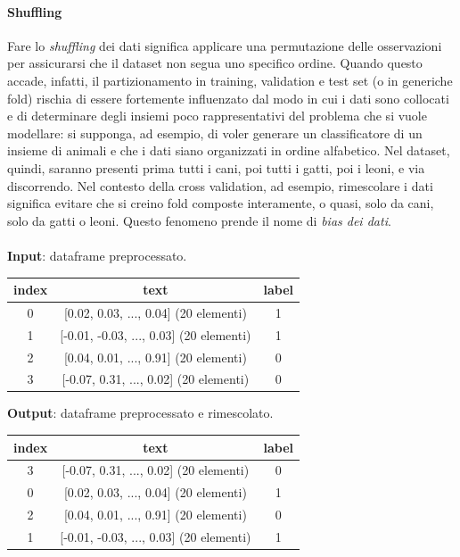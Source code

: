 \documentclass[12pt]{report}
\theoremstyle{definition}
\begin{document}
\paragraph{Shuffling}
Fare lo \textit{shuffling} dei dati significa applicare una permutazione delle osservazioni per assicurarsi che il dataset non segua uno specifico ordine. Quando questo accade, infatti, il partizionamento in training, validation e test set (o in generiche fold) rischia di essere fortemente influenzato dal modo in cui i dati sono collocati e di determinare degli insiemi poco rappresentativi del problema che si vuole modellare: si supponga, ad esempio, di voler generare un classificatore di un insieme di animali e che i dati siano organizzati in ordine alfabetico. Nel dataset, quindi, saranno presenti prima tutti i cani, poi tutti i gatti, poi i leoni, e via discorrendo. Nel contesto della cross validation, ad esempio, rimescolare i dati significa evitare che si creino fold composte interamente, o quasi, solo da cani, solo da gatti o leoni. Questo fenomeno prende il nome di \textit{bias dei dati}.
\\
\\
\textbf{Input}: dataframe preprocessato.
\begin{center}
    \begin{tabular}{|c|c|c|}
    \hline
    \textbf{index} & \textbf{text} & \textbf{label} \\
    \hline
         0 & [0.02, 0.03, ..., 0.04] (20 elementi) & 1 \\
         1 & [-0.01, -0.03, ..., 0.03] (20 elementi) & 1 \\
         2 & [0.04, 0.01, ..., 0.91] (20 elementi) & 0 \\
         3 & [-0.07, 0.31, ..., 0.02] (20 elementi) & 0 \\
    \hline
    \end{tabular}
\end{center}
\textbf{Output}: dataframe preprocessato e rimescolato.
\begin{center}
    \begin{tabular}{|c|c|c|}
    \hline
    \textbf{index} & \textbf{text} & \textbf{label} \\
    \hline
        3 & [-0.07, 0.31, ..., 0.02] (20 elementi) & 0 \\
        0 & [0.02, 0.03, ..., 0.04] (20 elementi) & 1 \\
        2 & [0.04, 0.01, ..., 0.91] (20 elementi) & 0 \\
        1 & [-0.01, -0.03, ..., 0.03] (20 elementi) & 1 \\
    \hline
    \end{tabular}
\end{center}
\end{document}
